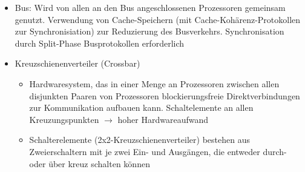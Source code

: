 \begin{itemize}
\begin{itemize}
\begin{itemize}
			\item Bus: Wird von allen an den Bus angeschlossenen Prozessoren gemeinsam genutzt. Verwendung von Cache-Speichern (mit Cache-Kohärenz-Protokollen zur Synchronisiation) zur Reduzierung des Busverkehrs. Synchronisation durch Split-Phase Busprotokollen erforderlich
			\item Kreuzschienenverteiler (Crossbar)
			\begin{itemize}
				\item Hardwaresystem, das in einer Menge an Prozessoren zwischen allen disjunkten Paaren von Prozessoren blockierungsfreie Direktverbindungen zur Kommunikation aufbauen kann. Schaltelemente an allen Kreuzungspunkten \(\rightarrow\) hoher Hardwareaufwand
				\item Schalterelemente (2x2-Kreuzschienenverteiler) bestehen aus Zweierschaltern mit je zwei Ein- und Ausgängen, die entweder durch- oder über kreuz schalten können
			\end{itemize}
		\end{itemize}
	\end{itemize}
\end{itemize}


